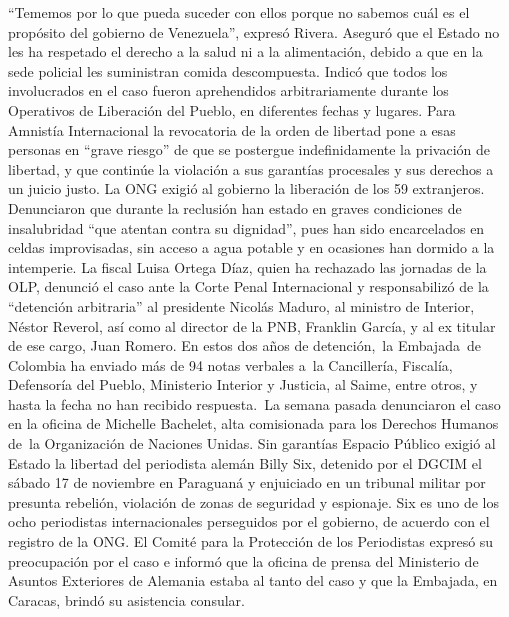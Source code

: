 \documentclass{article}%
\begin{document}
\newline%
%
“Tememos por lo que pueda suceder con ellos porque no sabemos cuál es el propósito del gobierno de Venezuela”, expresó Rivera. Aseguró que el Estado no les ha respetado el derecho a la salud ni a la alimentación, debido a que en la sede policial les suministran comida descompuesta.%
\newline%
%
Indicó que todos los involucrados en el caso fueron aprehendidos arbitrariamente durante los Operativos de Liberación del Pueblo, en diferentes fechas y lugares.%
\newline%
%
Para Amnistía Internacional la revocatoria de la orden de libertad pone a esas personas en “grave riesgo” de que se postergue indefinidamente la privación de libertad, y que continúe la violación a sus garantías procesales y sus derechos a un juicio justo.%
\newline%
%
La ONG exigió al gobierno la liberación de los 59 extranjeros. Denunciaron que durante la reclusión han estado en graves condiciones de insalubridad “que atentan contra su dignidad”, pues han sido encarcelados en celdas improvisadas, sin acceso a agua potable y en ocasiones han dormido a la intemperie.%
\newline%
%
La fiscal Luisa Ortega Díaz, quien ha rechazado las jornadas de la OLP, denunció el caso ante la Corte Penal Internacional y responsabilizó de la “detención arbitraria” al presidente Nicolás Maduro, al ministro de Interior, Néstor Reverol, así como al director de la PNB, Franklin García, y al ex titular de ese cargo, Juan Romero.%
\newline%
%
En estos dos años de detención,~la Embajada~de Colombia ha enviado más de 94 notas verbales a~la Cancillería, Fiscalía, Defensoría del Pueblo, Ministerio Interior y Justicia, al Saime, entre otros, y hasta la fecha no han recibido respuesta.~La semana pasada denunciaron el caso en la oficina de Michelle Bachelet, alta comisionada para los Derechos Humanos de~la Organización de Naciones Unidas.%
\newline%
%
Sin garantías%
\newline%
%
Espacio Público exigió al Estado la libertad del periodista alemán Billy Six, detenido por el DGCIM el sábado 17 de noviembre en Paraguaná y enjuiciado en un tribunal militar por presunta rebelión, violación de zonas de seguridad y espionaje.%
\newline%
%
Six es uno de los ocho periodistas internacionales perseguidos por el gobierno, de acuerdo con el registro de la ONG. El Comité para la Protección de los Periodistas expresó su preocupación por el caso e informó que la oficina de prensa del Ministerio de Asuntos Exteriores de Alemania estaba al tanto del caso y que la Embajada, en Caracas, brindó su asistencia consular.%
\newline%
%
\end{document}
